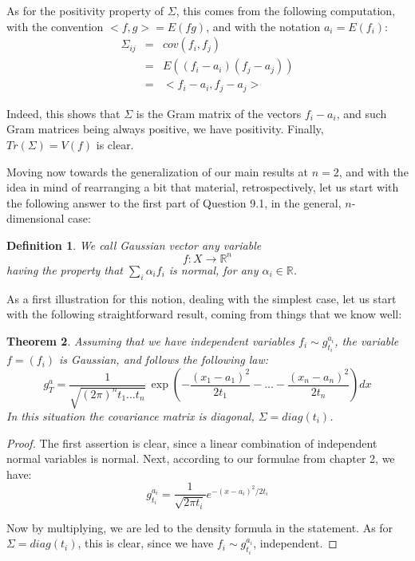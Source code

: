 \documentclass[12pt]{amsbook}
\newtheorem{theorem}{Theorem}[chapter]
\newtheorem{definition}[theorem]{Definition}
\begin{document}
As for the positivity property of $\Sigma$, this comes from the following computation, with the convention $<f,g>=E(fg)$, and with the notation $a_i=E(f_i)$:
\begin{eqnarray*}
\Sigma_{ij}
&=&cov(f_i,f_j)\\
&=&E\left((f_i-a_i)(f_j-a_j)\right)\\
&=&<f_i-a_i,f_j-a_j>
\end{eqnarray*}

Indeed, this shows that $\Sigma$ is the Gram matrix of the vectors $f_i-a_i$, and such Gram matrices being always positive, we have positivity. Finally, $Tr(\Sigma)=V(f)$ is clear.

\bigskip

Moving now towards the generalization of our main results at $n=2$, and with the idea in mind of rearranging a bit that material, retrospectively, let us start with the following answer to the first part of Question 9.1, in the general, $n$-dimensional case:

\begin{definition}
We call Gaussian vector any variable 
$$f:X\to\mathbb R^n$$
having the property that $\sum_i\alpha_if_i$ is normal, for any $\alpha_i\in\mathbb R$.
\end{definition}

As a first illustration for this notion, dealing with the simplest case, let us start with the following straightforward result, coming from things that we know well:

\begin{theorem}
Assuming that we have independent variables $f_i\sim g_{t_i}^{a_i}$, the variable $f=(f_i)$ is Gaussian, and follows the following law:
$$g_T^a=\frac{1}{\sqrt{(2\pi)^nt_1\ldots t_n}}\,\exp\left(-\frac{(x_1-a_1)^2}{2t_1}-\ldots-\frac{(x_n-a_n)^2}{2t_n}\right)dx$$
In this situation the covariance matrix is diagonal, $\Sigma=diag(t_i)$.
\end{theorem}

\begin{proof}
The first assertion is clear, since a linear combination of independent normal variables is normal. Next, according to our formulae from chapter 2, we have:
$$g_{t_i}^{a_i}=\frac{1}{\sqrt{2\pi t_i}}e^{-(x-a_i)^2/2t_i}$$

Now by multiplying, we are led to the density formula in the statement. As for $\Sigma=diag(t_i)$, this is clear, since we have $f_i\sim g_{t_i}^{a_i}$, independent.
\end{proof}
\end{document}
